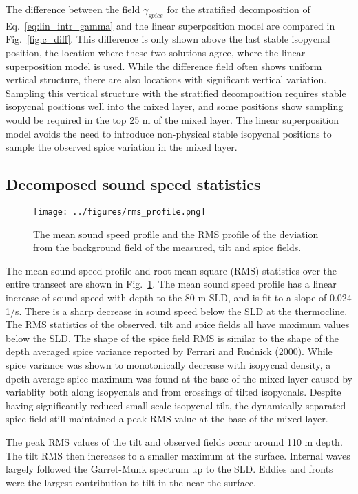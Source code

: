 \documentclass[preprint,NumberedRefs]{JASA}
\begin{document}
The difference between the field $\gamma_{spice}$ for the stratified decomposition of Eq.~\eqref{eq:lin_intr_gamma} and the linear superposition model are compared in Fig.~\ref{fig:c_diff}. This difference is only shown above the last stable isopycnal position, the location where these two solutions agree, where the linear superposition model is used. While the difference field often shows uniform vertical structure, there are also locations with significant vertical variation. Sampling this vertical structure with the stratified decomposition requires stable isopycnal positions well into the mixed layer, and some positions show sampling would be required in the top 25 m of the mixed layer. The linear superposition model avoids the need to introduce non-physical stable isopycnal positions to sample the observed spice variation in the mixed layer.

\subsection{Decomposed sound speed statistics}
\begin{figure}
\texttt{[image: ../figures/rms\_profile.png]}
    \caption{\label{fig:c_rms}{The mean sound speed profile and the RMS profile of the deviation from the background field of the measured, tilt and spice fields. }}
\end{figure}

The mean sound speed profile and root mean square (RMS) statistics over the entire transect are shown in Fig.~\ref{fig:c_rms}. The mean sound speed profile has a linear increase of sound speed with depth to the 80 m SLD, and is fit to a slope of 0.024 1/s. There is a sharp decrease in sound speed below the SLD at the thermocline. The RMS statistics of the observed, tilt and spice fields all have maximum values below the SLD. The shape of the spice field RMS is similar to the shape of the depth averaged spice variance reported by Ferrari and Rudnick (2000)\citep{ferrari2000}. While spice variance was shown to monotonically decrease with isopycnal density, a dpeth average spice maximum was found at the base of the mixed layer caused by variablity both along isopycnals and from crossings of tilted isopycnals. Despite having significantly reduced small scale isopycnal tilt, the dynamically separated spice field still maintained a peak RMS value at the base of the mixed layer.

The peak RMS values of the tilt and observed fields occur around 110 m depth. The tilt RMS then increases to a smaller maximum at the surface. Internal waves largely followed the Garret-Munk spectrum up to the SLD. Eddies and fronts were the largest contribution to tilt in the near the surface.
\end{document}
